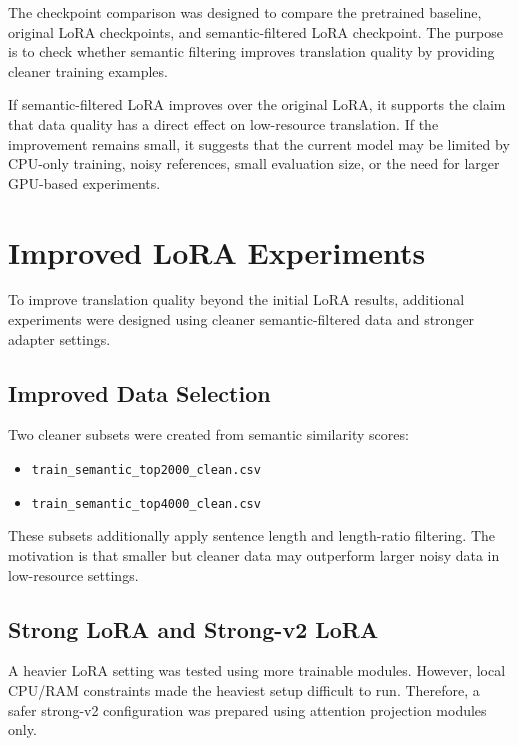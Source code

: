 \documentclass[conference]{IEEEtran}
\begin{document}
The checkpoint comparison was designed to compare the pretrained baseline, original LoRA checkpoints, and semantic-filtered LoRA checkpoint. The purpose is to check whether semantic filtering improves translation quality by providing cleaner training examples.

If semantic-filtered LoRA improves over the original LoRA, it supports the claim that data quality has a direct effect on low-resource translation. If the improvement remains small, it suggests that the current model may be limited by CPU-only training, noisy references, small evaluation size, or the need for larger GPU-based experiments.

\section{Improved LoRA Experiments}

To improve translation quality beyond the initial LoRA results, additional experiments were designed using cleaner semantic-filtered data and stronger adapter settings.

\subsection{Improved Data Selection}

Two cleaner subsets were created from semantic similarity scores:

\begin{itemize}
    \item \texttt{train\_semantic\_top2000\_clean.csv}
    \item \texttt{train\_semantic\_top4000\_clean.csv}
\end{itemize}

These subsets additionally apply sentence length and length-ratio filtering. The motivation is that smaller but cleaner data may outperform larger noisy data in low-resource settings.

\subsection{Strong LoRA and Strong-v2 LoRA}

A heavier LoRA setting was tested using more trainable modules. However, local CPU/RAM constraints made the heaviest setup difficult to run. Therefore, a safer strong-v2 configuration was prepared using attention projection modules only.
\end{document}
